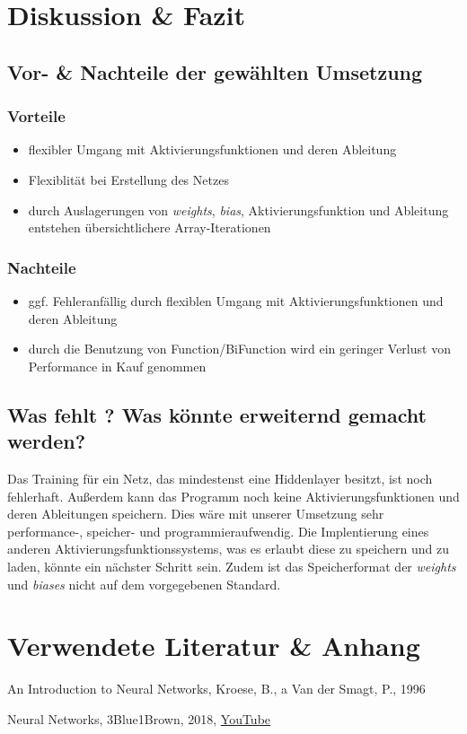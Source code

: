 \documentclass[paper=A4,pagesize=auto,12pt,headinclude=true,footinclude=true,BCOR=0mm,DIV=calc]{scrartcl}
\begin{document}
\newpage

\section{Diskussion \& Fazit}

\subsection{Vor- \& Nachteile der gewählten Umsetzung}
\subsubsection{Vorteile}
\begin{itemize}
	\item flexibler Umgang mit Aktivierungsfunktionen und deren Ableitung
	\item Flexiblität bei Erstellung des Netzes
	\item durch Auslagerungen von \textit{weights}, \textit{bias}, Aktivierungsfunktion und Ableitung entstehen übersichtlichere Array-Iterationen
\end{itemize}
\subsubsection{Nachteile}
\begin{itemize}
	\item ggf. Fehleranfällig durch flexiblen Umgang mit Aktivierungsfunktionen und deren Ableitung
	\item durch die Benutzung von Function/BiFunction wird ein geringer Verlust von Performance in Kauf genommen
\end{itemize}
\subsection{Was fehlt ? Was könnte erweiternd gemacht werden?}
Das Training für ein Netz, das mindestenst eine Hiddenlayer besitzt, ist noch fehlerhaft. Außerdem kann das Programm noch keine Aktivierungsfunktionen und deren Ableitungen speichern.
Dies wäre mit unserer Umsetzung sehr performance-, speicher- und programmieraufwendig. Die Implentierung eines anderen Aktivierungsfunktionssystems, was es erlaubt diese zu speichern und zu laden, könnte ein nächster Schritt sein.
Zudem ist das Speicherformat der \textit{weights} und \textit{biases} nicht auf dem vorgegebenen Standard.
\newpage

\section{Verwendete Literatur \& Anhang}
\begin{itemize}
	\item{An Introduction to Neural Networks, Kroese, B., a Van der Smagt, P., 1996}
	\hypertarget{3b1b}{\item{Neural Networks, 3Blue1Brown, 2018, \hyperref{https://www.youtube.com/playlist?list=PLZHQObOWTQDNU6R1_67000Dx_ZCJB-3pi}{}{}{YouTube}}}
\end{itemize}
\end{document}
